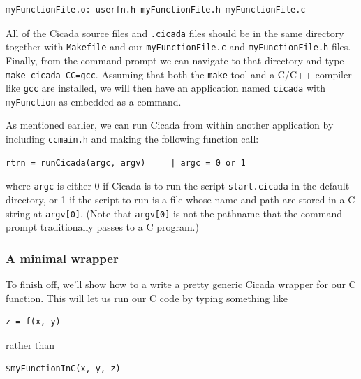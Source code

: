 \documentclass{article}
\newenvironment{code}{
       \begin{list}{}{
               \setlength{\leftmargin}{.4in}
               \setlength{\rightmargin}{0in}
               \setlength{\topsep}{.2in}
       }
       \small
       \item[] }
       { \end{list}   }
\begin{document}
\begin{code} \begin{verbatim}
myFunctionFile.o: userfn.h myFunctionFile.h myFunctionFile.c
\end{verbatim} \end{code}

All of the Cicada source files and \verb#.cicada# files should be in the same directory together with \verb#Makefile# and our \verb#myFunctionFile.c# and \verb#myFunctionFile.h# files.  Finally, from the command prompt we can navigate to that directory and type \verb#make cicada CC=gcc#.  Assuming that both the \verb#make# tool and a C/C++ compiler like \verb#gcc# are installed, we will then have an application named \verb#cicada# with \verb#myFunction# as embedded as a command.  

As mentioned earlier, we can run Cicada from within another application by including \verb#ccmain.h# and making the following function call:

\begin{code} \begin{verbatim}
rtrn = runCicada(argc, argv)     | argc = 0 or 1
\end{verbatim} \end{code}

\noindent where \verb#argc# is either 0 if Cicada is to run the script \verb#start.cicada# in the default directory, or 1 if the script to run is a file whose name and path are stored in a C string at \verb#argv[0]#.  (Note that \verb#argv[0]# is not the pathname that the command prompt traditionally passes to a C program.)




\subsubsection{A minimal wrapper}

To finish off, we'll show how to a write a pretty generic Cicada wrapper for our C function.  This will let us run our C code by typing something like

\begin{code} \begin{verbatim}
z = f(x, y)
\end{verbatim} \end{code}

\noindent rather than

\begin{code} \begin{verbatim}
$myFunctionInC(x, y, z)
\end{verbatim} \end{code}
\end{document}
